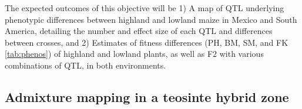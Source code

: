The expected outcomes of this objective will be 1) A map of QTL underlying phenotypic differences between highland and lowland maize in Mexico and South America, detailing the number and effect size of each QTL and differences between crosses, and 2) Estimates of fitness differences (PH, BM, SM, and FK \ref{tab:phenos}) of highland and lowland plants, as well as F2 with various combinations of QTL, in both environments. 



\subsection{Admixture mapping in a teosinte hybrid zone} \label{subsec:admixmap}





